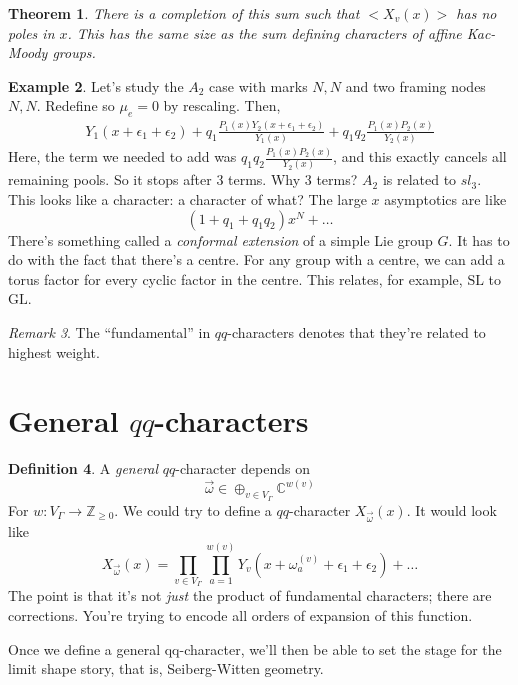 \documentclass[leqno, openany]{memoir}
\newtheorem{thm}{Theorem}[section]
\theoremstyle{definition}
\newtheorem{defn}[thm]{Definition}
\newtheorem{exm}[thm]{Example}
\theoremstyle{remark}
\newtheorem{rmk}[thm]{Remark}
\theoremstyle{plain}
\theoremstyle{definition}
\theoremstyle{remark}
\newcommand{\mr}[1]{\mathrm{#1}}
\newcommand{\GL}{\mr{GL}}
\begin{document}
\begin{thm}
There is a completion of this sum such that $<X_v(x)>$ has no poles in $x$. 
This has the same size as the sum defining characters of affine Kac-Moody groups. 
\end{thm}
\begin{exm}
Let's study the $A_2$ case with marks $N,N$ and two framing nodes $N,N$.
Redefine so $\mu_e = 0$ by rescaling. Then, 
\begin{align*}
Y_1(x + \epsilon_1 + \epsilon_2) + q_1 \frac{P_1(x) Y_2(x + \epsilon_1 + \epsilon_2)}{Y_1(x)} + q_1 q_2 \frac{P_1(x) P_2(x)}{Y_2(x)}
\end{align*}
Here, the term we needed to add was $q_1 q_2 \frac{P_1(x) P_2(x)}{Y_2(x)}$, and this 
exactly cancels all remaining pools. So it stops after 3 terms. Why 3 terms? $A_2$ is related to $sl_3$.
This looks like a character: a character of what?
The large $x$ asymptotics are like 
\[
(1 + q_1 + q_1 q_2) x^N + \dots 
\]
There's something called a \emph{conformal extension} of a simple Lie group $G$. It has to do with the fact that 
there's a centre. For any group with a centre, we can add a torus factor for every cyclic factor in the centre. 
This relates, for example, $\mr{SL}$ to $\GL$. 
\end{exm}

\begin{rmk}
The ``fundamental'' in $qq$-characters denotes that they're related to highest weight. 
\end{rmk}

\section{General $qq$-characters}%
\label{sec:General qq-characters}

\begin{defn}
A \emph{general} $qq$-character depends on 
\[
\vec{\omega} \in \oplus_{v \in V_\Gamma} \mathbb{C}^{w(v)}
\]
For $w : V_\Gamma \to \mathbb{Z}_{\geq 0}$.
We could try to define a $qq$-character $X_{\vec{\omega}}(x)$. It would look like 
\[
X_{\vec{\omega}}(x) = \prod_{v \in V_\Gamma} \prod_{a = 1}^{w(v)} Y_v(x + \omega^{(v)}_a + \epsilon_1 + \epsilon_2) + \dots 
\]
The point is that it's not \emph{just} the product of fundamental characters; there are corrections.
You're trying to encode all orders of expansion of this function.
\end{defn}

Once we define a general qq-character, we'll then be able to set the stage for the limit shape story, that is, Seiberg-Witten geometry.
\end{document}
